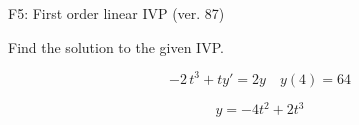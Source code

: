 \begin{exercise}
  \begin{exerciseTitle}F5: First order linear IVP (ver. 87)\end{exerciseTitle}
  \begin{exerciseStatement}
    
Find the solution to the given IVP.

    
\[-2 \, t^{3} +ty'= 2 y \hspace{1em} y( 4 ) = 64\]

  \end{exerciseStatement}
  \begin{exerciseAnswer}
    
\[y= -4 t^ 2 +2 t^{3}\]

  \end{exerciseAnswer}
\end{exercise}